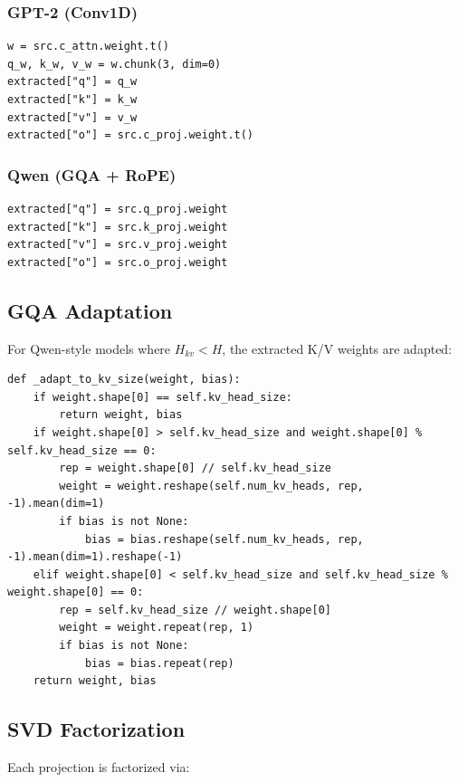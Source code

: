 \subsubsection{GPT-2 (Conv1D)}

\begin{lstlisting}
w = src.c_attn.weight.t()
q_w, k_w, v_w = w.chunk(3, dim=0)
extracted["q"] = q_w
extracted["k"] = k_w
extracted["v"] = v_w
extracted["o"] = src.c_proj.weight.t()
\end{lstlisting}

\subsubsection{Qwen (GQA + RoPE)}

\begin{lstlisting}
extracted["q"] = src.q_proj.weight
extracted["k"] = src.k_proj.weight
extracted["v"] = src.v_proj.weight
extracted["o"] = src.o_proj.weight
\end{lstlisting}

\subsection{GQA Adaptation}

For Qwen-style models where $H_{kv} < H$, the extracted K/V weights are 
adapted:

\begin{lstlisting}
def _adapt_to_kv_size(weight, bias):
    if weight.shape[0] == self.kv_head_size:
        return weight, bias
    if weight.shape[0] > self.kv_head_size and weight.shape[0] % self.kv_head_size == 0:
        rep = weight.shape[0] // self.kv_head_size
        weight = weight.reshape(self.num_kv_heads, rep, -1).mean(dim=1)
        if bias is not None:
            bias = bias.reshape(self.num_kv_heads, rep, -1).mean(dim=1).reshape(-1)
    elif weight.shape[0] < self.kv_head_size and self.kv_head_size % weight.shape[0] == 0:
        rep = self.kv_head_size // weight.shape[0]
        weight = weight.repeat(rep, 1)
        if bias is not None:
            bias = bias.repeat(rep)
    return weight, bias
\end{lstlisting}

\subsection{SVD Factorization}

Each projection is factorized via:

